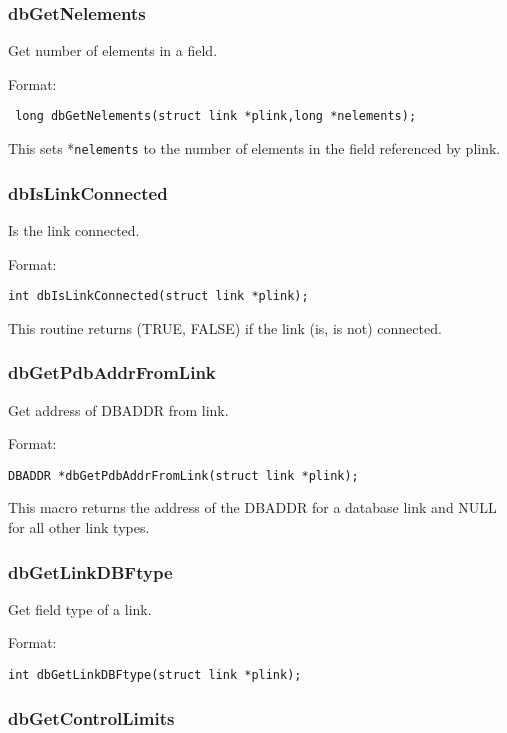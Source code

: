 \subsubsection{dbGetNelements}

Get number of elements in a field.

Format:

\begin{verbatim} long dbGetNelements(struct link *plink,long *nelements);
\end{verbatim}This sets *\verb|nelements| to the number of elements in the field referenced by plink.

\subsubsection{dbIsLinkConnected}

Is the link connected.

Format:

\begin{verbatim}int dbIsLinkConnected(struct link *plink);
\end{verbatim}This routine returns (TRUE, FALSE) if the link (is, is not) connected.

\subsubsection{dbGetPdbAddrFromLink}

Get address of DBADDR from link.

Format:

\begin{verbatim}DBADDR *dbGetPdbAddrFromLink(struct link *plink);
\end{verbatim}This macro returns the address of the DBADDR for a database link and NULL for all other link types.

\subsubsection{dbGetLinkDBFtype}

Get field type of a link.

Format:

\begin{verbatim}int dbGetLinkDBFtype(struct link *plink);
\end{verbatim}\subsubsection{dbGetControlLimits}

